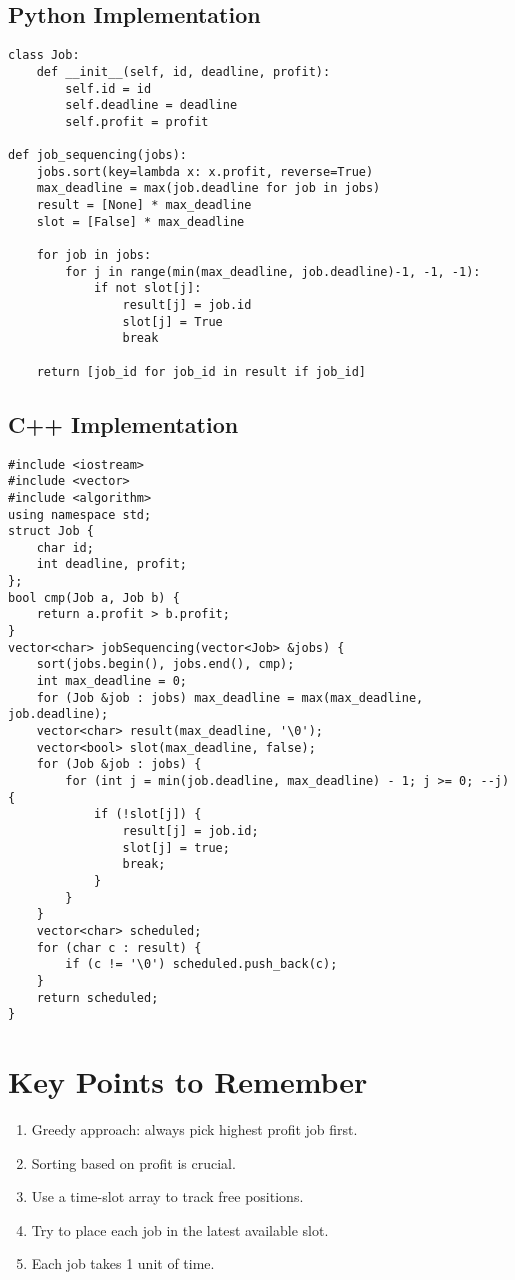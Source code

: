 \documentclass[14pt]{extarticle}
\begin{document}
\newpage
\subsection{Python Implementation}
\begin{lstlisting}[style=python, caption={Job Sequencing with Deadline in Python}]
class Job:
    def __init__(self, id, deadline, profit):
        self.id = id
        self.deadline = deadline
        self.profit = profit

def job_sequencing(jobs):
    jobs.sort(key=lambda x: x.profit, reverse=True)
    max_deadline = max(job.deadline for job in jobs)
    result = [None] * max_deadline
    slot = [False] * max_deadline

    for job in jobs:
        for j in range(min(max_deadline, job.deadline)-1, -1, -1):
            if not slot[j]:
                result[j] = job.id
                slot[j] = True
                break

    return [job_id for job_id in result if job_id]
\end{lstlisting}

\newpage
\subsection{C++ Implementation}
\begin{lstlisting}[style=cpp, caption={Job Sequencing with Deadline in C++}]
#include <iostream>
#include <vector>
#include <algorithm>
using namespace std;
struct Job {
    char id;
    int deadline, profit;
};
bool cmp(Job a, Job b) {
    return a.profit > b.profit;
}
vector<char> jobSequencing(vector<Job> &jobs) {
    sort(jobs.begin(), jobs.end(), cmp);
    int max_deadline = 0;
    for (Job &job : jobs) max_deadline = max(max_deadline, job.deadline);
    vector<char> result(max_deadline, '\0');
    vector<bool> slot(max_deadline, false);
    for (Job &job : jobs) {
        for (int j = min(job.deadline, max_deadline) - 1; j >= 0; --j) {
            if (!slot[j]) {
                result[j] = job.id;
                slot[j] = true;
                break;
            }
        }
    }
    vector<char> scheduled;
    for (char c : result) {
        if (c != '\0') scheduled.push_back(c);
    }
    return scheduled;
}
\end{lstlisting}

\newpage
\section{Key Points to Remember}
\begin{enumerate}
    \item Greedy approach: always pick highest profit job first.
    \item Sorting based on profit is crucial.
    \item Use a time-slot array to track free positions.
    \item Try to place each job in the latest available slot.
    \item Each job takes 1 unit of time.
\end{enumerate}
\end{document}
